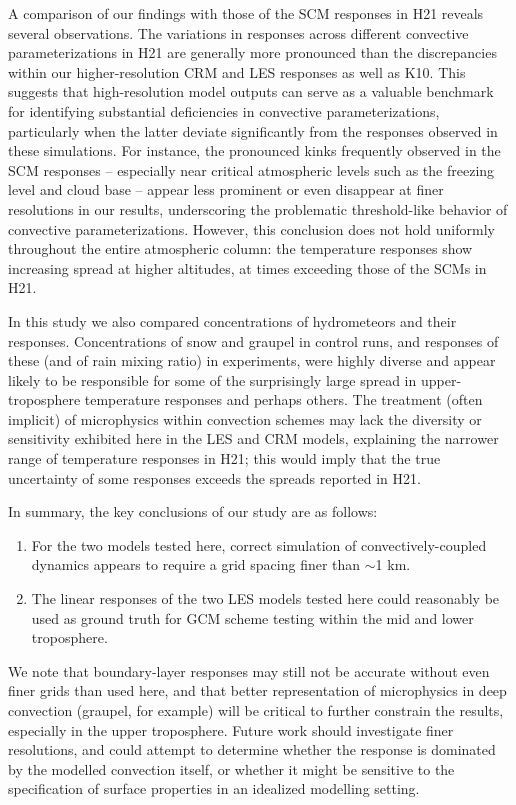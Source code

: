 \documentclass[draft]{agujournal2019}
\begin{document}
A comparison of our findings with those of the SCM responses in H21 reveals
several observations. The variations in responses across different convective
parameterizations in H21 are generally more pronounced than the discrepancies
within our higher-resolution CRM and LES responses as well as K10. This suggests
that high-resolution model outputs can serve as a valuable benchmark for
identifying substantial deficiencies in convective parameterizations,
particularly when the latter deviate significantly from the responses observed
in these simulations. For instance, the pronounced kinks frequently observed in
the SCM responses -- especially near critical atmospheric levels such as the
freezing level and cloud base -- appear less prominent or even disappear at
finer resolutions in our results, underscoring the problematic threshold-like
behavior of convective parameterizations. However, this conclusion does not hold
uniformly throughout the entire atmospheric column: the temperature responses
show increasing spread at higher altitudes, at times exceeding those of the SCMs
in H21. 

In this study we also compared concentrations of hydrometeors and their
responses. Concentrations of snow and graupel in control runs, and responses of
these (and of rain mixing ratio) in experiments, were highly diverse and appear
likely to be responsible for some of the surprisingly large spread in upper-
troposphere temperature responses and perhaps others. The treatment (often
implicit) of microphysics within convection schemes may lack the diversity or
sensitivity exhibited here in the LES and CRM models, explaining the narrower
range of temperature responses in H21; this would imply that the true
uncertainty of some responses exceeds the spreads reported in H21.

In summary, the key conclusions of our study are as follows:

\begin{enumerate}
    \item For the two models tested here, correct simulation of
    convectively-coupled dynamics appears to require a grid spacing finer than
    $\sim$1 km.
    \item The linear responses of the two LES models tested here could
    reasonably be used as ground truth for GCM scheme testing within the mid and
    lower troposphere.
\end{enumerate}

We note that boundary-layer responses may still not be accurate without even
finer grids than used here, and that better representation of microphysics in
deep convection (graupel, for example) will be critical to further constrain the
results, especially in the upper troposphere. Future work should investigate
finer resolutions, and could attempt to determine whether the response is
dominated by the modelled convection itself, or whether it might be sensitive to
the specification of surface properties in an idealized modelling setting.
\end{document}
